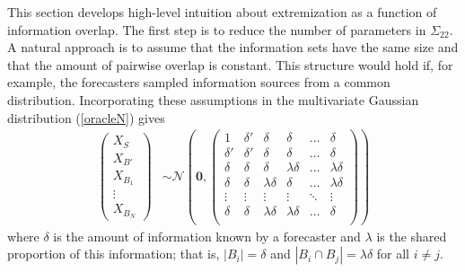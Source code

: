 \documentclass[11pt]{article}
\theoremstyle{definition}
\theoremstyle{definition}
\def\probit{p_{\rm probit}}
\begin{document}
This section develops high-level intuition about extremization as a function of information overlap. The first step is to reduce the number of parameters in $\Sigma_{22}$. A natural approach is to assume that the
information sets have the same size and that the amount of pairwise overlap
is constant.
This structure would hold if, for example, the
forecasters sampled information sources from a common distribution.
Incorporating these assumptions in the multivariate Gaussian distribution
(\ref{oracleN}) gives
\begin{align}
\left(\begin{matrix} X_{S} \\ X_{B'}\\ X_{B_1}\\ \vdots \\ X_{B_N} \end{matrix}\right) &\sim \mathcal{N}\left( 
 \boldsymbol{0}, 
 \left(\begin{array}{cc|cccc}
1 & \delta'& \delta & \delta & \dots & \delta  \\ 
\delta' & \delta' & \delta & \delta & \dots & \delta  \\ \hline
\delta & \delta &\delta & \lambda\delta & \dots & \lambda\delta   \\ 
\delta& \delta & \lambda\delta & \delta & \dots & \lambda\delta  \\ 
\vdots &\vdots & \vdots & \vdots & \ddots & \vdots  \\ 
\delta &\delta & \lambda\delta & \lambda\delta & \dots & \delta\\ 
 \end{array}\right)\right) \label{symmetric}
\end{align}
where $\delta$ is the amount of information known by a forecaster and
$\lambda$ is the shared proportion of this information; that is, $|B_{i}| =
\delta$ and $|B_{i} \cap B_{j}| = \lambda \delta$ for all $i \neq
j$.
\end{document}
